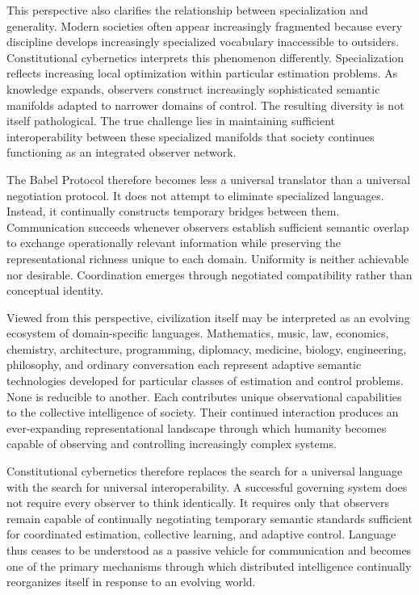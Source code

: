 \documentclass[12pt,a4paper]{article}
\begin{document}
This perspective also clarifies the relationship between specialization and generality. Modern societies often appear increasingly fragmented because every discipline develops increasingly specialized vocabulary inaccessible to outsiders. Constitutional cybernetics interprets this phenomenon differently. Specialization reflects increasing local optimization within particular estimation problems. As knowledge expands, observers construct increasingly sophisticated semantic manifolds adapted to narrower domains of control. The resulting diversity is not itself pathological. The true challenge lies in maintaining sufficient interoperability between these specialized manifolds that society continues functioning as an integrated observer network.

The Babel Protocol therefore becomes less a universal translator than a universal negotiation protocol. It does not attempt to eliminate specialized languages. Instead, it continually constructs temporary bridges between them. Communication succeeds whenever observers establish sufficient semantic overlap to exchange operationally relevant information while preserving the representational richness unique to each domain. Uniformity is neither achievable nor desirable. Coordination emerges through negotiated compatibility rather than conceptual identity.

Viewed from this perspective, civilization itself may be interpreted as an evolving ecosystem of domain-specific languages. Mathematics, music, law, economics, chemistry, architecture, programming, diplomacy, medicine, biology, engineering, philosophy, and ordinary conversation each represent adaptive semantic technologies developed for particular classes of estimation and control problems. None is reducible to another. Each contributes unique observational capabilities to the collective intelligence of society. Their continued interaction produces an ever-expanding representational landscape through which humanity becomes capable of observing and controlling increasingly complex systems.

Constitutional cybernetics therefore replaces the search for a universal language with the search for universal interoperability. A successful governing system does not require every observer to think identically. It requires only that observers remain capable of continually negotiating temporary semantic standards sufficient for coordinated estimation, collective learning, and adaptive control. Language thus ceases to be understood as a passive vehicle for communication and becomes one of the primary mechanisms through which distributed intelligence continually reorganizes itself in response to an evolving world.
\end{document}
